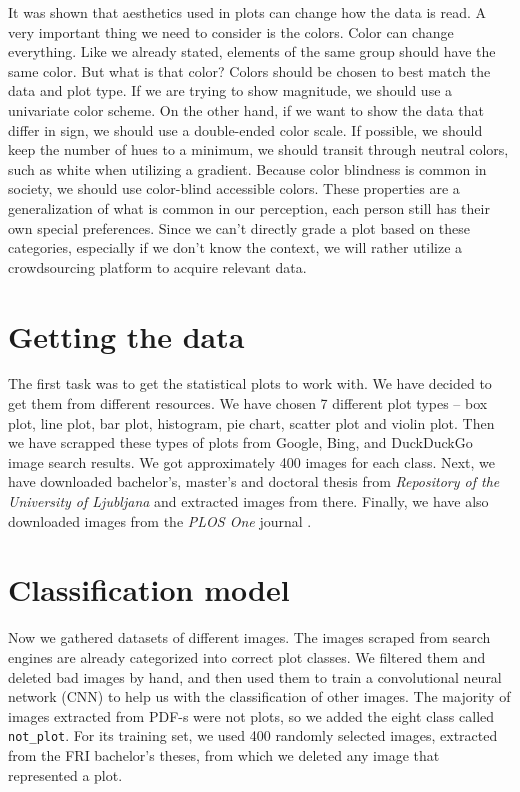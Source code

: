 \documentclass[fleqn,moreauthors,10pt]{ds_report}
\begin{document}
	It was shown that aesthetics used in plots can change how the data is read. A very important thing we need to consider is the colors. Color can change everything. Like we already stated, elements of the same group should have the same color. But what is that color? Colors should be chosen to best match the data and plot type. If we are trying to show magnitude, we should use a univariate color scheme. On the other hand, if we want to show the data that differ in sign, we should use a double-ended color scale. If possible, we should keep the number of hues to a minimum, we should transit through neutral colors, such as white when utilizing a gradient. Because color blindness is common in society, we should use color-blind accessible colors. These properties are a generalization of what is common in our perception, each person still has their own special preferences. Since we can't directly grade a plot based on these categories, especially if we don't know the context, we will rather utilize a crowdsourcing platform to acquire relevant data.
	
	\section*{Getting the data}
	The first task was to get the statistical plots to work with. We have decided to get them from different resources. We have chosen 7 different plot types -- box plot, line plot, bar plot, histogram, pie chart, scatter plot and violin plot. Then we have scrapped these types of plots from Google, Bing, and DuckDuckGo image search results. We got approximately 400 images for each class. Next, we have downloaded bachelor's, master's and doctoral thesis from \emph{Repository of the University of Ljubljana} \cite{repositoryUL} and extracted images from there. Finally, we have also downloaded images from the \emph{PLOS One} journal \cite{plosone}.
	
	\section*{Classification model}
	Now we gathered datasets of different images. The images scraped from search engines are already categorized into correct plot classes. We filtered them and deleted bad images by hand, and then used them to train a convolutional neural network (CNN) to help us with the classification of other images. The majority of images extracted from PDF-s were not plots, so we added the eight class called \texttt{not\_plot}. For its training set, we used 400 randomly selected images, extracted from the FRI bachelor's theses, from which we deleted any image that represented a plot. 
	
\end{document}
